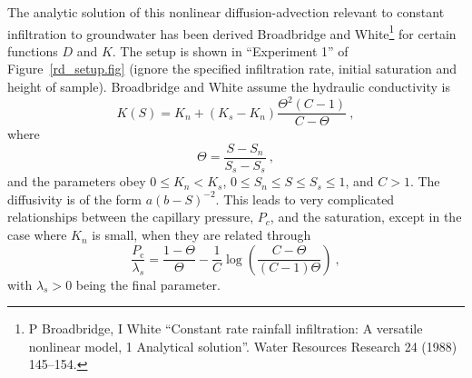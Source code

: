 \documentclass[]{scrreprt}
\begin{document}
The analytic solution of this nonlinear diffusion-advection relevant
to constant infiltration to groundwater has been derived Broadbridge
and White\footnote{P Broadbridge, I White ``Constant rate rainfall
  infiltration: A versatile nonlinear model, 1 Analytical solution''.
  Water Resources Research 24 (1988) 145--154.} for certain functions
$D$ and $K$.  The setup is shown in ``Experiment 1'' of
Figure~\ref{rd_setup.fig} (ignore the specified infiltration rate,
initial saturation and height of sample).  Broadbridge and White
assume the hydraulic conductivity is
\begin{equation}
K(S) = K_{n} + (K_{s}-K_{n})\frac{\Theta^{2}(C-1)}{C-\Theta} \ ,
\end{equation}
where
\begin{equation}
\Theta = \frac{S - S_{n}}{S_{s} - S_{s}} \ ,
\end{equation}
and the parameters obey $0 \leq K_{n} < K_{s}$, $0 \leq S_{n} \leq S
\leq S_{s}\leq 1$, and $C>1$.  The diffusivity is of the form
$a(b-S)^{-2}$.  This leads to very complicated relationships between
the capillary pressure, $P_{c}$, and the saturation, except in the
case where $K_{n}$ is small, when they are related through
\begin{equation}
\frac{P_{\mathrm{c}}}{\lambda_{s}} = \frac{1-\Theta}{\Theta} - \frac{1}{C}\log
\left( \frac{C-\Theta}{(C-1)\Theta} \right) \ ,
\end{equation}
with $\lambda_{s}>0$ being the final parameter.
\end{document}
